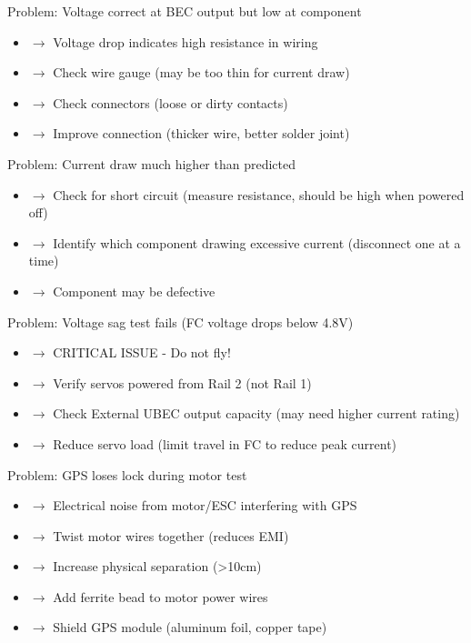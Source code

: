 \documentclass[11pt,letterpaper]{article}
\begin{document}
Problem: Voltage correct at BEC output but low at component\par

\begin{itemize}
  \item $\rightarrow$ Voltage drop indicates high resistance in wiring
  \item $\rightarrow$ Check wire gauge (may be too thin for current draw)
  \item $\rightarrow$ Check connectors (loose or dirty contacts)
  \item $\rightarrow$ Improve connection (thicker wire, better solder joint)
\end{itemize}

Problem: Current draw much higher than predicted\par

\begin{itemize}
  \item $\rightarrow$ Check for short circuit (measure resistance, should be high when powered off)
  \item $\rightarrow$ Identify which component drawing excessive current (disconnect one at a time)
  \item $\rightarrow$ Component may be defective
\end{itemize}

Problem: Voltage sag test fails (FC voltage drops below 4.8V)\par

\begin{itemize}
  \item $\rightarrow$ CRITICAL ISSUE - Do not fly!
  \item $\rightarrow$ Verify servos powered from Rail 2 (not Rail 1)
  \item $\rightarrow$ Check External UBEC output capacity (may need higher current rating)
  \item $\rightarrow$ Reduce servo load (limit travel in FC to reduce peak current)
\end{itemize}

Problem: GPS loses lock during motor test\par

\begin{itemize}
  \item $\rightarrow$ Electrical noise from motor/ESC interfering with GPS
  \item $\rightarrow$ Twist motor wires together (reduces EMI)
  \item $\rightarrow$ Increase physical separation (>10cm)
  \item $\rightarrow$ Add ferrite bead to motor power wires
  \item $\rightarrow$ Shield GPS module (aluminum foil, copper tape)
\end{itemize}
\end{document}
